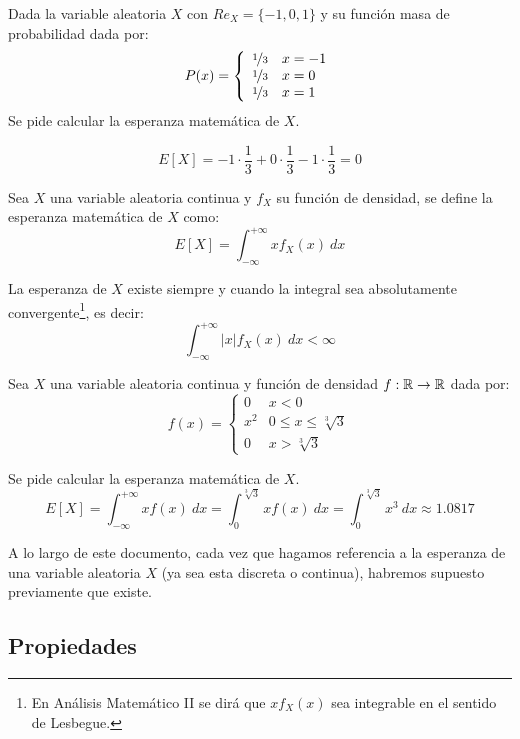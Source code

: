 \begin{ejemplo}
    Dada la variable aleatoria $X$ con $Re_X = \{-1, 0, 1\}$ y su función masa de probabilidad dada por:
    $$P(x) = \left\{ \begin{array}{cl}
        \nicefrac{1}{3} & x = -1 \\
        \nicefrac{1}{3} & x = 0  \\
        \nicefrac{1}{3} & x = 1
      \end{array} \right.$$
    Se pide calcular la esperanza matemática de $X$.
    
    $$E[X] = -1 \cdot \dfrac{1}{3} + 0 \cdot \dfrac{1}{3} -1 \cdot \dfrac{1}{3} = 0$$
\end{ejemplo}

\begin{definicion}
    Sea $X$ una variable aleatoria continua y $f_X$ su función de densidad, se define la esperanza matemática de $X$ como:
    $$E[X] = \int_{-\infty}^{+\infty} xf_X(x)~dx$$

    La esperanza de $X$ existe siempre y cuando la integral sea absolutamente convergente\footnote{En Análisis Matemático II se dirá que $xf_X(x)$ sea integrable en el sentido de Lesbegue.}, es decir:
    $$\int_{-\infty}^{+\infty} |x|f_X(x)~dx < \infty$$
\end{definicion}

\begin{ejemplo}
    Sea $X$ una variable aleatoria continua y función de densidad $f:\mathbb R \rightarrow \mathbb R$ dada por:
    $$f(x) = \left\{ \begin{array}{ll}
        0   & x < 0                     \\
        x^2 & 0 \leq x \leq \sqrt[3]{3} \\
        0   & x > \sqrt[3]{3}
    \end{array} \right.$$
    
    
    Se pide calcular la esperanza matemática de $X$.
    $$E[X] = \int_{-\infty}^{+\infty} xf(x)~dx = \int_0^{\sqrt[3]{3}} xf(x)~dx = \int_0^{\sqrt[3]{3}} x^3~dx \approx 1.0817$$
\end{ejemplo}

\begin{observacion}
A lo largo de este documento, cada vez que hagamos referencia a la esperanza de una variable aleatoria $X$ (ya sea esta discreta o continua), habremos supuesto previamente que existe.
\end{observacion}
\subsection{Propiedades}

